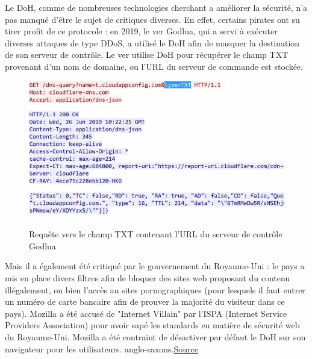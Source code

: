 \documentclass[a4paper,12pt]{article}
\begin{document}
	
	Le DoH, comme de nombreuses technologies cherchant a améliorer la sécurité, n'a pas manqué d'être le sujet de critiques diverses. En effet, certains pirates ont su tirer profit de ce protocole : en 2019, le ver Godlua, qui a servi à exécuter diverses attaques de type DDoS, a utilisé le DoH afin de masquer la destination de son serveur de contrôle. Le ver utilise DoH pour récupérer le champ TXT provenant d'un nom de domaine, ou l'URL du serveur de commande est stockée.
	
	\begin{figure}[H]
		\begin{center}
			{\includegraphics[scale=0.6]{Images/godlua_request.png}}
			\hspace*{12pt}\hbox{\scriptsize {}}
		\end{center}
		\caption{Requête vers le champ TXT contenant l'URL du serveur de contrôle Godlua}
	\end{figure}
	
	Mais il a également été critiqué par le gouvernement du Royaume-Uni : le pays a mis en place divers filtres afin de bloquer des sites web proposant du contenu illégalement, ou bien l'accès au sites pornographiques (pour lesquels il faut entrer un numéro de carte bancaire afin de prouver la majorité du visiteur dans ce pays). Mozilla a été accusé de "Internet Villain" par l'ISPA (Internet Service Providers Association) pour avoir sapé les standards en matière de sécurité web du Royaume-Uni. Mozilla a été contraint de désactiver par défaut le DoH sur son navigateur pour les utilisateurs. anglo-saxons.\href{https://www.theguardian.com/technology/2019/sep/24/firefox-no-uk-plans-to-make-encrypted-browser-tool-its-default}{Source}
	
\end{document}
